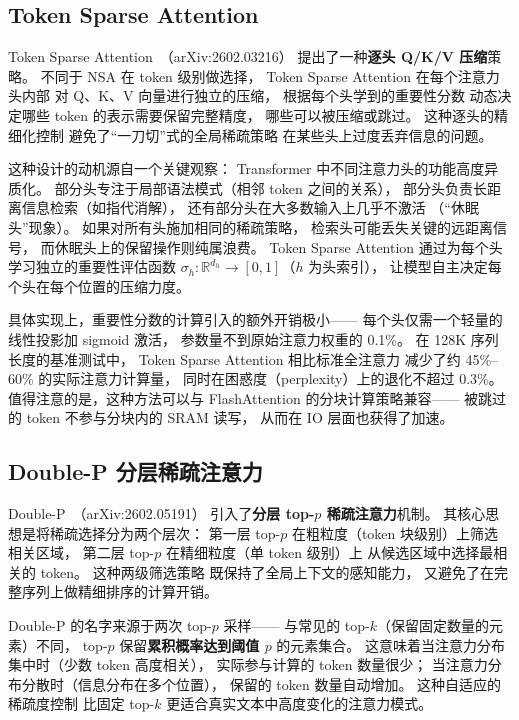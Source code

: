 \subsection{Token Sparse Attention}

Token Sparse Attention~\cite{tokensparse2026}（arXiv:2602.03216）
提出了一种\textbf{逐头 Q/K/V 压缩}策略。
不同于 NSA 在 token 级别做选择，
Token Sparse Attention 在每个注意力头内部
对 Q、K、V 向量进行独立的压缩，
根据每个头学到的重要性分数
动态决定哪些 token 的表示需要保留完整精度，
哪些可以被压缩或跳过。
这种逐头的精细化控制
避免了“一刀切”式的全局稀疏策略
在某些头上过度丢弃信息的问题。

这种设计的动机源自一个关键观察：
Transformer 中不同注意力头的功能高度异质化。
部分头专注于局部语法模式（相邻 token 之间的关系），
部分头负责长距离信息检索（如指代消解），
还有部分头在大多数输入上几乎不激活
（“休眠头”现象）。
如果对所有头施加相同的稀疏策略，
检索头可能丢失关键的远距离信号，
而休眠头上的保留操作则纯属浪费。
Token Sparse Attention 通过为每个头学习独立的重要性评估函数
$\sigma_h: \mathbb{R}^{d_h} \to [0, 1]$（$h$ 为头索引），
让模型自主决定每个头在每个位置的压缩力度。

具体实现上，重要性分数的计算引入的额外开销极小——
每个头仅需一个轻量的线性投影加 sigmoid 激活，
参数量不到原始注意力权重的 0.1\%。
在 128K 序列长度的基准测试中，
Token Sparse Attention 相比标准全注意力
减少了约 45\%--60\% 的实际注意力计算量，
同时在困惑度（perplexity）上的退化不超过 0.3\%。
值得注意的是，这种方法可以与 FlashAttention
的分块计算策略兼容——
被跳过的 token 不参与分块内的 SRAM 读写，
从而在 IO 层面也获得了加速。

\subsection{Double-P 分层稀疏注意力}

Double-P~\cite{doublep2026}（arXiv:2602.05191）
引入了\textbf{分层 top-$p$ 稀疏注意力}机制。
其核心思想是将稀疏选择分为两个层次：
第一层 top-$p$ 在粗粒度（token 块级别）上筛选相关区域，
第二层 top-$p$ 在精细粒度（单 token 级别）上
从候选区域中选择最相关的 token。
这种两级筛选策略
既保持了全局上下文的感知能力，
又避免了在完整序列上做精细排序的计算开销。

Double-P 的名字来源于两次 top-$p$ 采样——
与常见的 top-$k$（保留固定数量的元素）不同，
top-$p$ 保留\textbf{累积概率达到阈值 $p$} 的元素集合。
这意味着当注意力分布集中时（少数 token 高度相关），
实际参与计算的 token 数量很少；
当注意力分布分散时（信息分布在多个位置），
保留的 token 数量自动增加。
这种自适应的稀疏度控制
比固定 top-$k$ 更适合真实文本中高度变化的注意力模式。


